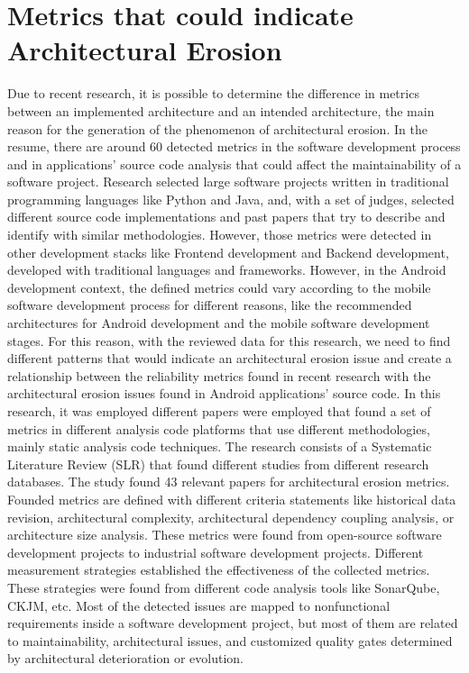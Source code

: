 \section{Metrics that could indicate Architectural Erosion}
Due to recent research, it is possible to determine the difference in metrics between an implemented architecture and an intended architecture, the main reason for the generation of the phenomenon of architectural erosion. In the resume, there are around 60 detected metrics in the software development process and in applications' source code analysis that could affect the maintainability of a software project. Research selected large software projects written in traditional programming languages like Python and Java, and, with a set of judges, selected different source code implementations and past papers that try to describe and identify with similar methodologies. However, those metrics were detected in other development stacks like Frontend development and Backend development, developed with traditional languages and frameworks. However, in the Android development context, the defined metrics could vary according to the mobile software development process for different reasons, like the recommended architectures for Android development and the mobile software development stages. For this reason, with the reviewed data for this research, we need to find different patterns that would indicate an architectural erosion issue and create a relationship between the reliability metrics found in recent research with the architectural erosion issues found in Android applications' source code.
In this research, it was employed different papers were employed that found a set of metrics in different analysis code platforms that use different methodologies, mainly static analysis code techniques. The research consists of a Systematic Literature Review (SLR) that found different studies from different research databases. The study found 43 relevant papers for architectural erosion metrics. Founded metrics are defined with different criteria statements like historical data revision, architectural complexity, architectural dependency coupling analysis, or architecture size analysis. These metrics were found from open-source software development projects to industrial software development projects.
Different measurement strategies established the effectiveness of the collected metrics. These strategies were found from different code analysis tools like SonarQube, CKJM, etc. Most of the detected issues are mapped to nonfunctional requirements inside a software development project, but most of them are related to maintainability, architectural issues, and customized quality gates determined by architectural deterioration or evolution.

